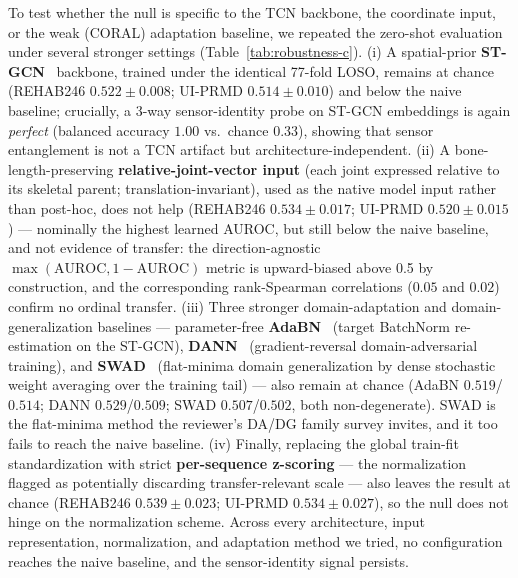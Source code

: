 \documentclass[10pt,journal]{IEEEtran}
\begin{document}
To test whether the null is specific to the TCN backbone, the coordinate input, or the weak (CORAL) adaptation baseline, we repeated the zero-shot evaluation under several stronger settings (Table~\ref{tab:robustness-c}). (i) A spatial-prior \textbf{ST-GCN}~\cite{yan2018stgcn} backbone, trained under the identical 77-fold LOSO, remains at chance (REHAB246 $0.522\pm0.008$; UI-PRMD $0.514\pm0.010$) and below the naive baseline; crucially, a 3-way sensor-identity probe on ST-GCN embeddings is again \emph{perfect} (balanced accuracy $1.00$ vs.\ chance $0.33$), showing that sensor entanglement is not a TCN artifact but architecture-independent. (ii) A bone-length-preserving \textbf{relative-joint-vector input} (each joint expressed relative to its skeletal parent; translation-invariant), used as the native model input rather than post-hoc, does not help (REHAB246 $0.534\pm0.017$; UI-PRMD $0.520\pm0.015$) --- nominally the highest learned AUROC, but still below the naive baseline, and not evidence of transfer: the direction-agnostic $\max(\text{AUROC},1-\text{AUROC})$ metric is upward-biased above 0.5 by construction, and the corresponding rank-Spearman correlations ($0.05$ and $0.02$) confirm no ordinal transfer. (iii) Three stronger domain-adaptation and domain-generalization baselines --- parameter-free \textbf{AdaBN}~\cite{li2018adabn} (target BatchNorm re-estimation on the ST-GCN), \textbf{DANN}~\cite{ganin2016dann} (gradient-reversal domain-adversarial training), and \textbf{SWAD}~\cite{cha2021swad} (flat-minima domain generalization by dense stochastic weight averaging over the training tail) --- also remain at chance (AdaBN $0.519$/$0.514$; DANN $0.529$/$0.509$; SWAD $0.507$/$0.502$, both non-degenerate). SWAD is the flat-minima method the reviewer's DA/DG family survey invites, and it too fails to reach the naive baseline. (iv) Finally, replacing the global train-fit standardization with strict \textbf{per-sequence z-scoring} --- the normalization flagged as potentially discarding transfer-relevant scale --- also leaves the result at chance (REHAB246 $0.539\pm0.023$; UI-PRMD $0.534\pm0.027$), so the null does not hinge on the normalization scheme. Across every architecture, input representation, normalization, and adaptation method we tried, no configuration reaches the naive baseline, and the sensor-identity signal persists.
\end{document}
